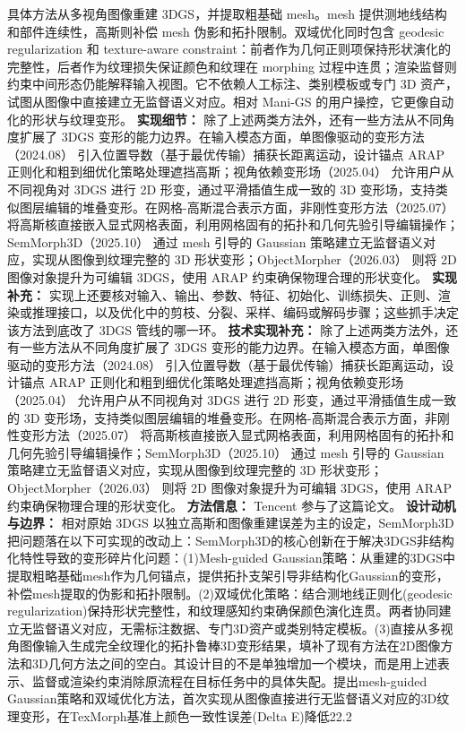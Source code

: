 具体方法从多视角图像重建 3DGS，并提取粗基础 mesh。mesh 提供测地线结构和部件连续性，高斯则补偿 mesh 伪影和拓扑限制。双域优化同时包含 geodesic regularization 和 texture-aware constraint：前者作为几何正则项保持形状演化的完整性，后者作为纹理损失保证颜色和纹理在 morphing 过程中连贯；渲染监督则约束中间形态仍能解释输入视图。它不依赖人工标注、类别模板或专门 3D 资产，试图从图像中直接建立无监督语义对应。相对 Mani-GS 的用户操控，它更像自动化的形状与纹理变形。
\textbf{实现细节：} 除了上述两类方法外，还有一些方法从不同角度扩展了 3DGS 变形的能力边界。在输入模态方面，单图像驱动的变形方法（2024.08） 引入位置导数（基于最优传输）捕获长距离运动，设计锚点 ARAP 正则化和粗到细优化策略处理遮挡高斯；视角依赖变形场（2025.04） 允许用户从不同视角对 3DGS 进行 2D 形变，通过平滑插值生成一致的 3D 变形场，支持类似图层编辑的堆叠变形。在网格-高斯混合表示方面，非刚性变形方法（2025.07） 将高斯核直接嵌入显式网格表面，利用网格固有的拓扑和几何先验引导编辑操作；SemMorph3D（2025.10） 通过 mesh 引导的 Gaussian 策略建立无监督语义对应，实现从图像到纹理完整的 3D 形状变形；ObjectMorpher（2026.03） 则将 2D 图像对象提升为可编辑 3DGS，使用 ARAP 约束确保物理合理的形状变化。
\textbf{实现补充：} 实现上还要核对输入、输出、参数、特征、初始化、训练损失、正则、渲染或推理接口，以及优化中的剪枝、分裂、采样、编码或解码步骤；这些抓手决定该方法到底改了 3DGS 管线的哪一环。
\textbf{技术实现补充：} 除了上述两类方法外，还有一些方法从不同角度扩展了 3DGS 变形的能力边界。在输入模态方面，单图像驱动的变形方法（2024.08） 引入位置导数（基于最优传输）捕获长距离运动，设计锚点 ARAP 正则化和粗到细优化策略处理遮挡高斯；视角依赖变形场（2025.04） 允许用户从不同视角对 3DGS 进行 2D 形变，通过平滑插值生成一致的 3D 变形场，支持类似图层编辑的堆叠变形。在网格-高斯混合表示方面，非刚性变形方法（2025.07） 将高斯核直接嵌入显式网格表面，利用网格固有的拓扑和几何先验引导编辑操作；SemMorph3D（2025.10） 通过 mesh 引导的 Gaussian 策略建立无监督语义对应，实现从图像到纹理完整的 3D 形状变形；ObjectMorpher（2026.03） 则将 2D 图像对象提升为可编辑 3DGS，使用 ARAP 约束确保物理合理的形状变化。
\textbf{方法信息：} Tencent 参与了这篇论文。
\textbf{设计动机与边界：} 相对原始 3DGS 以独立高斯和图像重建误差为主的设定，SemMorph3D 把问题落在以下可实现的改动上：SemMorph3D的核心创新在于解决3DGS非结构化特性导致的变形碎片化问题：(1)Mesh-guided Gaussian策略：从重建的3DGS中提取粗略基础mesh作为几何锚点，提供拓扑支架引导非结构化Gaussian的变形，补偿mesh提取的伪影和拓扑限制。(2)双域优化策略：结合测地线正则化(geodesic regularization)保持形状完整性，和纹理感知约束确保颜色演化连贯。两者协同建立无监督语义对应，无需标注数据、专门3D资产或类别特定模板。(3)直接从多视角图像输入生成完全纹理化的拓扑鲁棒3D变形结果，填补了现有方法在2D图像方法和3D几何方法之间的空白。其设计目的不是单独增加一个模块，而是用上述表示、监督或渲染约束消除原流程在目标任务中的具体失配。提出mesh-guided Gaussian策略和双域优化方法，首次实现从图像直接进行无监督语义对应的3D纹理变形，在TexMorph基准上颜色一致性误差(Delta E)降低22.2%

